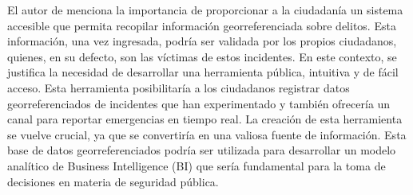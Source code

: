 El autor de \cite{naranjo-avalosImpactoGeorreferenciacionColaborativa2019} menciona la importancia de proporcionar a
la ciudadanía un sistema accesible que permita recopilar información georreferenciada sobre delitos. Esta información,
una vez ingresada, podría ser validada por los propios ciudadanos, quienes, en su defecto, son las víctimas de estos
incidentes. En este contexto, se justifica la necesidad de desarrollar una herramienta pública, intuitiva y de fácil acceso.
Esta herramienta posibilitaría a los ciudadanos registrar datos georreferenciados  de incidentes que han experimentado
y también ofrecería un canal para reportar emergencias en tiempo real. La creación de esta  herramienta se vuelve crucial,
ya que se convertiría en una valiosa fuente de información. Esta base de datos georreferenciados  podría ser utilizada
para desarrollar un modelo analítico de Business Intelligence (BI) que sería fundamental para la toma de  decisiones
en materia de seguridad pública.